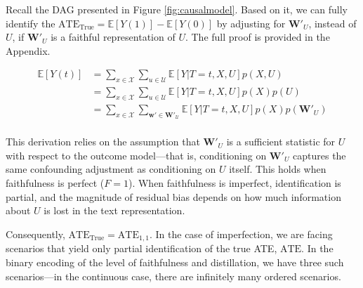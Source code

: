 \documentclass[11pt]{article}
\newcommand{\E}{\mathbb{E}}
\begin{document}
Recall the DAG presented in Figure \ref{fig:causalmodel}. Based on it, we can fully identify the $\textrm{ATE}_{\textrm{True}}=\E[Y(1)] - \E[Y(0)]$ by adjusting for $\bm{W'}_U$, instead of $U$, if $\bm{W'}_U$ is a faithful representation of $U$. The full proof is provided in the Appendix.

\begin{align*}
\E[Y(t)] &=  \sum_{x \in \mathcal{X}} \sum_{u \in \mathcal{U}} \E[Y|T=t,X,U] p(X,U) \\
&=  \sum_{x \in \mathcal{X}} \sum_{u \in \mathcal{U}} \E[Y|T=t,X,U] p(X) p(U) \\
&=  \sum_{x \in \mathcal{X}} \sum_{\bm{w'} \in \mathcal{\bm{W'}_U}} \E[Y|T=t,X,U] p(X) p(\bm{W'}_U) \\
\end{align*}

This derivation relies on the assumption that $\bm{W'}_U$ is a sufficient statistic for $U$ with respect to the outcome model---that is, conditioning on $\bm{W'}_U$ captures the same confounding adjustment as conditioning on $U$ itself. This holds when faithfulness is perfect ($F=1$). When faithfulness is imperfect, identification is partial, and the magnitude of residual bias depends on how much information about $U$ is lost in the text representation.

 Consequently, $\textrm{ATE}_{\textrm{True}}=\textrm{ATE}_{1,1}$. In the case of imperfection, we are facing scenarios that yield only partial identification of the true ATE, $\textrm{ATE}$. In the binary encoding of the level of faithfulness and distillation, we have three such scenarios---in the continuous case, there are infinitely many ordered scenarios.
\end{document}
